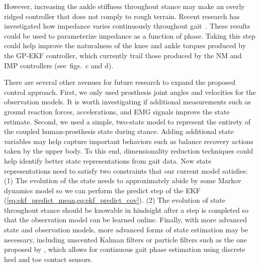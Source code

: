 However, increasing the ankle stiffness throughout stance may make an overly
ridged controller that does not comply to rough terrain. Recent research has
investigated how impedance varies continuously throughout
gait~\citep{lee2016summary}. These results could be used to parameterize
impedance as a function of phase. Taking this step could help improve the
naturalness of the knee and ankle torques produced by the GP-EKF controller,
which currently trail those produced by the NM and IMP controllers
(see~figs.~c and d).

There are several other avenues for future research to expand the proposed
control approach. First, we only used prosthesis joint angles and velocities for
the observation models. It is worth investigating if additional measurements
such as ground reaction forces, accelerations, and EMG signals improve the state
estimate.  Second, we used a simple, two-state model to represent the entirety
of the coupled human-prosthesis state during stance. Adding additional state
variables may help capture important behaviors such as balance recovery actions
taken by the upper body. To this end, dimensionality reduction techniques could
help identify better state representations from gait data. New state
representations need to satisfy two constraints that our current model
satisfies: (1) The evolution of the state needs to approximately abide by some
Markov dynamics model so we can perform the predict step of the EKF
(\cref{eq:ekf_predict_mean,eq:ekf_predict_cov}). (2) The evolution of state
throughout stance should be knowable in hindsight after a step is completed so
that the observation model can be learned online. Finally, with more advanced
state and observation models, more advanced forms of state estimation may be
necessary, including unscented Kalman filters or particle filters such as the
one proposed by \citet{dhir2018locomotion}, which allows for continuous gait
phase estimation using discrete heel and toe contact sensors. 
